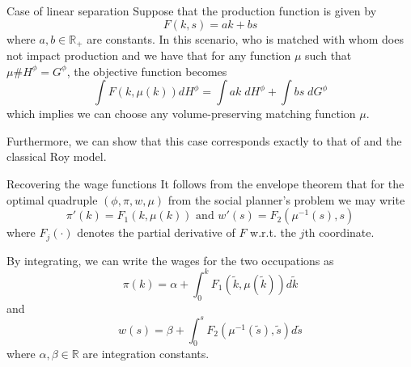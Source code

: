 \documentclass{beamer}
\begin{document}
	\begin{frame}{Case of linear separation}
		Suppose that the production function is given by 
		\begin{equation*}
			F(k,s) = ak + bs
		\end{equation*}
		where $a,b \in \mathbb{R}_+$ are constants. In this scenario, who is matched with whom does not impact production and we have that for any function $\mu$ such that $\mu\#H^\phi = G^\phi$, the objective function becomes
		\begin{equation*}
			\int F(k,\mu(k)) dH^\phi = \int ak \; dH^\phi + \int bs \; dG^\phi
		\end{equation*}
		which implies we can choose any volume-preserving matching function $\mu$.
		
		\bigskip
		
		Furthermore, we can show that this case corresponds exactly to that of \citet{heckman1990empirical} and the classical Roy model.
	\end{frame}
	
	\begin{frame}{Recovering the wage functions}
		It follows from the envelope theorem that for the optimal quadruple $(\phi,\pi,w,\mu)$ from the social planner's problem we may write
		\begin{equation*}
			\pi'(k) = F_1(k,\mu(k)) \text{ and } w'(s) = F_2(\mu^{-1}(s),s)
		\end{equation*}
		where $F_j(\cdot)$ denotes the partial derivative of $F$ w.r.t. the $j$th coordinate.
		
		\bigskip
		\bigskip
		
		By integrating, we can write the wages for the two occupations as
		\begin{equation*}
			\pi(k) = \alpha + \int_0^kF_1(\tilde{k},\mu(\tilde{k})) d\tilde{k}
		\end{equation*}
		and
		\begin{equation*}
			w(s) = \beta + \int_0^sF_2(\mu^{-1}(\tilde{s}),\tilde{s}) d\tilde{s}
		\end{equation*}
		where $\alpha,\beta \in \mathbb{R}$ are integration constants.
	\end{frame}
	
\end{document}
